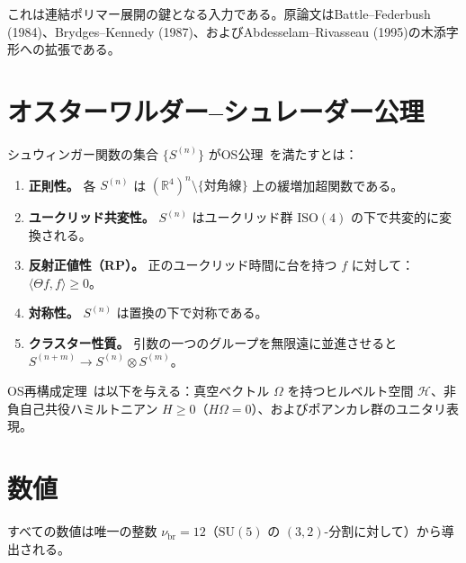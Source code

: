 \documentclass[12pt]{article}
\theoremstyle{plain}
\theoremstyle{definition}
\numberwithin{equation}{section}
\newcommand{\R}{\mathbb{R}}
\newcommand{\br}{\mathrm{br}}
\begin{document}
これは連結ポリマー展開の鍵となる入力である。原論文はBattle--Federbush (1984)、Brydges--Kennedy (1987)、およびAbdesselam--Rivasseau (1995)の木添字形への拡張である。


\section{オスターワルダー--シュレーダー公理}\label{app:OS}

シュウィンガー関数の集合 $\{S^{(n)}\}$ がOS公理~\cite{OsterwalderSchrader}を満たすとは：

\begin{enumerate}[label=(OS\arabic*)]
\item \textbf{正則性。} 各 $S^{(n)}$ は $(\R^4)^n\setminus\{\text{対角線}\}$ 上の緩増加超関数である。
\item \textbf{ユークリッド共変性。} $S^{(n)}$ はユークリッド群 $\mathrm{ISO}(4)$ の下で共変的に変換される。
\item \textbf{反射正値性（RP）。} 正のユークリッド時間に台を持つ $f$ に対して：$\langle\Theta f,f\rangle\geq 0$。
\item \textbf{対称性。} $S^{(n)}$ は置換の下で対称である。
\item \textbf{クラスター性質。} 引数の一つのグループを無限遠に並進させると $S^{(n+m)}\to S^{(n)}\otimes S^{(m)}$。
\end{enumerate}

OS再構成定理~\cite{OsterwalderSchrader}は以下を与える：真空ベクトル $\Omega$ を持つヒルベルト空間 $\mathcal{H}$、非負自己共役ハミルトニアン $H\geq 0$（$H\Omega=0$）、およびポアンカレ群のユニタリ表現。


\section{数値}\label{app:numerics}

すべての数値は唯一の整数 $\nu_{\br}=12$（$\mathrm{SU}(5)$ の $(3,2)$-分割に対して）から導出される。
\end{document}
